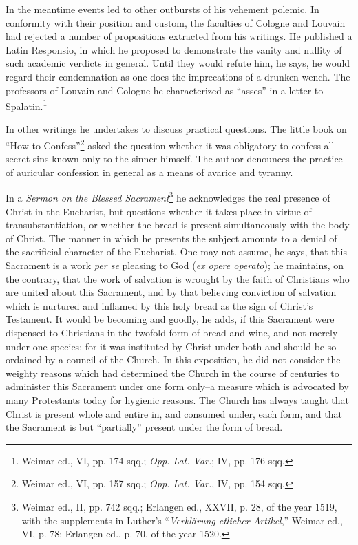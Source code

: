 In the meantime events led to other outbursts of his vehement
polemic. In conformity with their position and custom, the faculties
of Cologne and Louvain had rejected a number of propositions extracted
from his writings. He published a Latin Responsio, in which
he proposed to demonstrate the vanity and nullity of such academic
verdicts in general. Until they would refute him, he says, he would
regard their condemnation as one does the imprecations of a drunken
wench. The professors of Louvain and Cologne he characterized as
“asses” in a letter to Spalatin.\footnote{Weimar ed., VI, pp. 174 sqq.; \textit{Opp. Lat. Var.}; IV, pp. 176 sqq.}

In other writings he undertakes to discuss practical questions. The
little book on “How to Confess”\footnote{Weimar ed., VI, pp. 157 sqq.; \textit{Opp. Lat. Var.}, IV, pp. 154 sqq.}
asked the question whether it
was obligatory to confess all secret sins known only to the sinner
himself. The author denounces the practice of auricular confession
in general as a means of avarice and tyranny.

In a \textit{Sermon on the Blessed Sacrament}\footnote
{Weimar ed., II, pp. 742 sqq.; Erlangen ed., XXVII, p. 28, of the year 1519, with
the supplements in Luther’s “\textit{Verklärung etlicher Artikel},” Weimar ed., VI, p. 78;
Erlangen ed., p. 70, of the year 1520.}
he acknowledges the real
presence of Christ in the Eucharist, but questions whether it takes
place in virtue of transubstantiation, or whether the bread is present
simultaneously with the body of Christ. The manner in which he presents
the subject amounts to a denial of the sacrificial character of
the Eucharist. One may not assume, he says, that this Sacrament
is a work \textit{per se} pleasing to God (\textit{ex opere operato}); he maintains,
on the contrary, that the work of salvation is wrought by the faith
of Christians who are united about this Sacrament, and by that believing
conviction of salvation which is nurtured and inflamed by
this holy bread as the sign of Christ’s Testament. It would be becoming
and goodly, he adds, if this Sacrament were dispensed to
Christians in the twofold form of bread and wine, and not merely
under one species; for it was instituted by Christ under both and
should be so ordained by a council of the Church. In this exposition,
he did not consider the weighty reasons which had determined the
Church in the course of centuries to administer this Sacrament under
one form only--a measure which is advocated by many Protestants
today for hygienic reasons. The Church has always taught that
Christ is present whole and entire in, and consumed under, each form,
and that the Sacrament is but “partially” present under the form
of bread.

